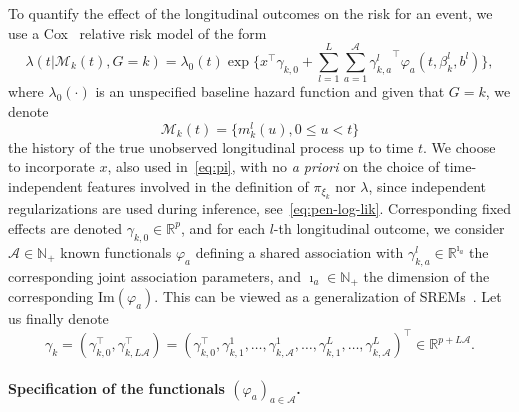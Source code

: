 \documentclass[11pt]{article}
\newcommand{\cM}{\mathcal M}
\newcommand{\cA}{\mathcal A}
\newcommand{\R}{\mathds R}
\newcommand{\N}{\mathds N}
\begin{document}
To quantify the effect of the longitudinal outcomes on the risk for an event, we use a Cox~\citep{Cox1972JRSS} relative risk model of the form
\begin{equation}
	\label{eq:intensity-model}
	\lambda(t|\cM_k(t), G = k) = \lambda_0(t) \exp \Big\{ x^\top \gamma_{k,0} + \sum_{l=1}^L \sum_{a=1}^\cA {\gamma_{k,a}^l}^\top \varphi_a(t, \beta_k^l, b^l) \Big\},
\end{equation}
where $\lambda_0(\cdot)$ is an unspecified baseline hazard function and given that $G = k$, we denote 
\[\cM_k(t) = \{m_k^l(u), 0 \leq u < t\}\] 
the history of the true unobserved longitudinal process up to time $t$. We choose to incorporate $x$, also used in~\eqref{eq:pi}, with no \textit{a priori} on the choice of time-independent features involved in the definition of $\pi_{\xi_k}$ nor $\lambda$, since independent regularizations are used during inference, see~\eqref{eq:pen-log-lik}. Corresponding fixed effects are denoted $\gamma_{k,0} \in \R^p$, and for each $l$-th longitudinal outcome, we consider $\cA \in \N_+$ known functionals $\varphi_a$ defining a shared association with $\gamma_{k,a}^l \in \R^{\imath_a}$ the corresponding joint association parameters, and $\imath_a \in \N_+$ the dimension of the corresponding $\text{Im}(\varphi_a)$. 
This can be viewed as a generalization of SREMs~\citep{rizopoulos2010jm}. Let us finally denote
\[\gamma_k= (\gamma_{k,0}^\top, \gamma_{k,L\cA}^\top)= (\gamma_{k,0}^\top, \gamma_{k,1}^1, \ldots, \gamma_{k,\cA}^1, \ldots, \gamma_{k,1}^L, \ldots, \gamma_{k,\cA}^L )^\top \in \R^{p+L\cA}. \]

\paragraph{Specification of the functionals $(\varphi_a)_{a\in \cA}$.}
\end{document}
